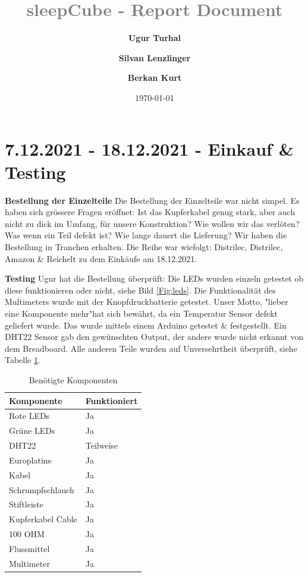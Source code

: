 \documentclass[12pt]{article}
\title{\textcolor{gray}{\textbf{sleepCube - Report Document}\\[0.2cm]}}
\author[1]{\fontsize{9}{9} \textbf{Ugur Turhal}}
\author[2]{\textbf{Silvan Lenzlinger}}
\author[1]{\textbf{Berkan Kurt}}
\affil[1]{\fontsize{8}{8}\href{mailto:ugur.turhal@me.com}{ugur.turhal@me.com}}
\affil[2]{test}
\affil[3]{test}
\date{\today}
\begin{document}
\maketitle

\section{7.12.2021 - 18.12.2021 - Einkauf \& Testing}
\justifying

\textbf{Bestellung der Einzelteile} 
Die Bestellung der Einzelteile war nicht simpel. Es haben sich grössere Fragen eröffnet: Ist das Kupferkabel genug stark, aber auch nicht zu dick im Umfang, für unsere Konstruktion? Wie wollen wir das verlöten? Was wenn ein Teil defekt ist? Wie lange dauert die Lieferung? Wir haben die Bestellung in Tranchen erhalten. Die Reihe war wiefolgt: Distrilec, Distrilec, Amazon \& Reichelt zu dem Einkäufe am 18.12.2021. \par \textbf{Testing} Ugur hat die Bestellung überprüft: Die LEDs wurden einzeln getestet ob diese funktionieren oder nicht, siehe Bild \ref{Fig:leds}. Die Funktionalität des Multimeters wurde mit der Knopfdruckbatterie getestet. Unser Motto, "lieber eine Komponente mehr"\text{ }hat sich bewährt, da ein Temperatur Sensor defekt geliefert wurde. Das wurde mittels einem Arduino getestet \& festgestellt. Ein DHT22 Sensor gab den gewünschten Output, der andere wurde nicht erkannt von dem Breadboard. Alle anderen Teile wurden auf Unversehrtheit überprüft, siehe Tabelle \ref{Tab:table1}.
\begin{table}[H]
\begin{center}
\begin{tabular}{l|l}
Komponente & Funktioniert \\ \hline
\hline
Rote LEDs   & Ja \\ \hline
Grüne LEDs   & Ja \\ \hline
DHT22   & Teilweise \\ \hline
Europlatine   & Ja \\ \hline
Kabel  & Ja  \\ \hline
Schrumpfschlauch & Ja \\ \hline
Stiftleiste   & Ja \\ \hline
Kupferkabel Cable  & Ja \\ \hline
100 OHM  & Ja \\ \hline
Flussmittel & Ja \\ \hline
Multimeter & Ja \\ \hline
\end{tabular}
\caption{Benötigte Komponenten}
\label{Tab:table1}
\end{center}
\end{table}
\end{document}
